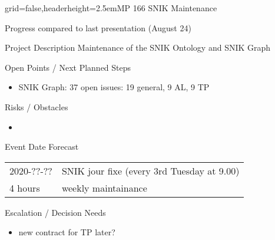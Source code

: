 \documentclass[english]{kiesgrube}
\begin{document}
\begin{poster}{grid=false,headerheight=2.5em}{}{MP 166 SNIK Maintenance}{}{}
\begin{posterbox}[name=progress,below=person]{Progress compared to last presentation (August 24)}
\end{posterbox}
\begin{posterbox}[name=description,column=1,row=0]{Project Description}
Maintenance of the SNIK Ontology and SNIK Graph
\end{posterbox}
\begin{posterbox}[name=open,column=1,below=description]{Open Points / Next Planned Steps}
\begin{itemize}
\item SNIK Graph: 37 open issues: 19 general, 9 AL, 9 TP
\end{itemize}
\end{posterbox}
\begin{posterbox}[name=risks,column=1,below=open]{Risks / Obstacles}
\begin{itemize}
\item
\end{itemize}
\end{posterbox}
\begin{posterbox}[name=event,column=1,below=open]{Event Date Forecast}
\begin{tabulary}{\textwidth}{lL}
2020-??-??	&SNIK jour fixe	(every 3rd Tuesday at 9.00)\\
4 hours		&weekly maintainance\\
\end{tabulary}
\end{posterbox}
\begin{posterbox}[name=escalation,column=1,below=event]{Escalation / Decision Needs}
\begin{itemize}
\item new contract for TP later?
\end{itemize}
\end{posterbox}
\footer
\end{poster}

\newpage
\end{document}
